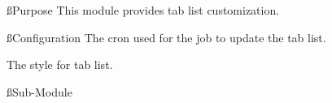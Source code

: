 
\ss{Purpose}
This module provides tab list customization.

\ss{Configuration}
The cron used for the job to update the tab list.

The style for tab list.

\ss{Sub-Module}


